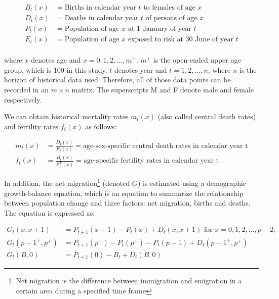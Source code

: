 \documentclass[11pt,a4paper,]{article}
\begin{document}
\begin{align*}
  B_t(x) &= \text{Births in calendar year $t$ to females of age $x$}\\
  D_t(x) &= \text{Deaths in calendar year $t$ of persons of age $x$}\\
  P_t(x) &= \text{Population of age $x$ at 1 January of year $t$}\\
  E_t(x) &= \text{Population of age $x$ exposed to risk at 30 June of year $t$}\\
\end{align*}

\vspace{-.4in}where \(x\) denotes age and \(x=0,1,2,\dots,m^+\). \(m^+\)
is the open-ended upper age group, which is 100 in this study. \(t\)
denotes year and \(t=1,2,\dots,n\), where \(n\) is the horizon of
historical data used. Therefore, all of those data points can be
recorded in an \(m\times n\) matrix. The superscripts M and F denote
male and female respectively.

We can obtain historical mortality rates \(m_t(x)\) (also called central
death rates) and fertility rates \(f_t(x)\) as follows: \vspace{-.3in}

\begin{align*}
  m_t(x) & = \frac{D_t(x)}{E_t(x)}=\text{age-sex-specific central death rates in calendar year t}\\
  f_t(x) & = \frac{B_t(x)}{E^F_t(x)}=\text{age-specific fertility rates in calendar year t}
\end{align*}

In addition, the net
migration\footnote{Net migration is the difference between immigration and emigration in a certain area during a specified time frame}
(denoted \(G\)) is estimated using a demographic growth-balance
equation, which is an equation to summarize the relationship between
population change and three factors: net migration, births and deaths.
The equation is expressed as: 
\vspace{-.3in}

\begin{align*}
  G_t(x,x+1)     & =P_{t+1}(x+1)-P_t(x)+D_t(x,x+1)\text{~for~} x=0,1,2,\dots,p-2,\\
  G_t(p-1^+,p^+) & =P_{t+1}(p^+)-P_t(p^+)-P_t(p-1)+D_t(p-1^+,p^+)\\
  G_t(B,0)       & =P_{t+1}(0)-B_t+D_t(B,0)
\end{align*}
\end{document}
